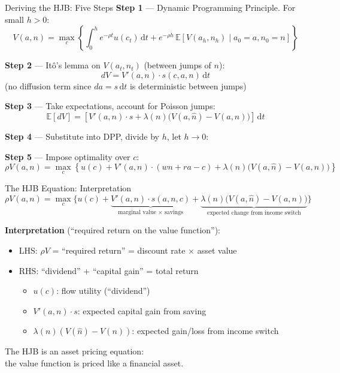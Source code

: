 \documentclass[aspectratio=169,11pt]{beamer}
\newcommand{\emphc}[1]{\textcolor{harvardcrimson}{#1}}
\newcommand{\E}[1]{\mathbb{E}\!\left[#1\right]}
\newcommand{\ud}{\,\mathrm{d}}
\begin{document}
\begin{frame}{Deriving the HJB: Five Steps}
\small
\textbf{Step 1} --- \emphc{Dynamic Programming Principle}. For small $h > 0$:
\[
V(a,n) = \max_c \left\{\int_0^h e^{-\rho t}u(c_t)\ud t + e^{-\rho h}\,\E{V(a_h, n_h) \mid a_0=a, n_0=n}\right\}
\]

\textbf{Step 2} --- \emphc{It\^o's lemma} on $V(a_t, n_t)$ (between jumps of $n$):
\[
dV = V'(a,n)\cdot s(c,a,n)\ud t
\]
(no diffusion term since $da = s\ud t$ is deterministic between jumps)

\textbf{Step 3} --- \emphc{Take expectations}, account for Poisson jumps:
\[
\E{dV} = \left[V'(a,n)\cdot s + \lambda(n)\big(V(a,\hat{n}) - V(a,n)\big)\right]\ud t
\]

\textbf{Step 4} --- \emphc{Substitute} into DPP, divide by $h$, let $h \to 0$:

\textbf{Step 5} --- \emphc{Impose optimality} over $c$:
\[
\boxed{\rho V(a,n) = \max_c\left\{u(c) + V'(a,n)\cdot(wn + ra - c) + \lambda(n)\big(V(a,\hat{n}) - V(a,n)\big)\right\}}
\]
\end{frame}

\begin{frame}{The HJB Equation: Interpretation}
\[
\rho V(a,n) = \max_c\Big\{u(c) + \underbrace{V'(a,n)\cdot s(a,n,c)}_{\text{marginal value $\times$ savings}} + \underbrace{\lambda(n)\big(V(a,\hat{n}) - V(a,n)\big)}_{\text{expected change from income switch}}\Big\}
\]

\vspace{0.2em}
\textbf{Interpretation} (``required return on the value function''):
\begin{itemize}\itemsep2pt
    \item \emphc{LHS}: $\rho V$ = ``required return'' = discount rate $\times$ asset value
    \item \emphc{RHS}: ``dividend'' + ``capital gain'' = total return
    \begin{itemize}
        \item $u(c)$: flow utility (``dividend'')
        \item $V'(a,n) \cdot s$: expected capital gain from saving
        \item $\lambda(n)(V(\hat{n}) - V(n))$: expected gain/loss from income switch
    \end{itemize}
\end{itemize}

\vspace{0.2em}
\begin{center}
\colorbox{uzhgreylight}{\parbox{0.6\textwidth}{\centering\small
The HJB is an \emphc{asset pricing equation}:\\
the value function is priced like a financial asset.}}
\end{center}
\end{frame}
\end{document}
